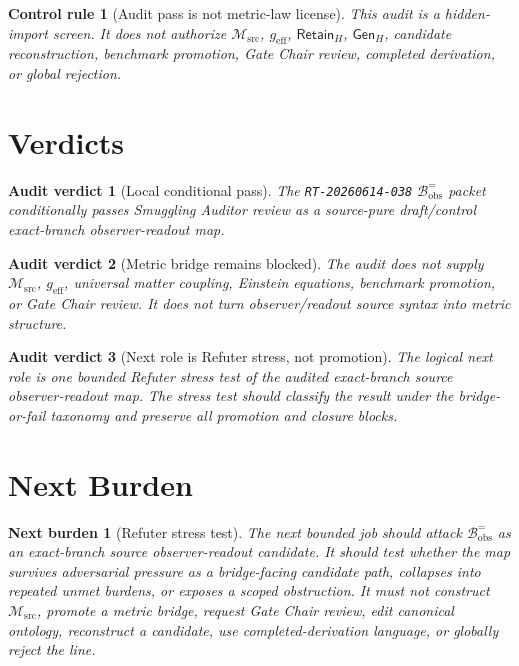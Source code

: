 \documentclass[11pt]{article}
\newcommand{\RetainH}{\mathsf{Retain}_{H}}
\newcommand{\GenH}{\mathsf{Gen}_{H}}
\newcommand{\Bobs}{\mathcal{B}^{=}_{\mathrm{obs}}}
\newcommand{\Msrc}{\mathcal{M}_{\mathrm{src}}}
\newcommand{\geff}{g_{\mathrm{eff}}}
\newtheorem{controlrule}{Control rule}
\newtheorem{verdict}{Audit verdict}
\newtheorem{nextburden}{Next burden}
\begin{document}
\begin{controlrule}[Audit pass is not metric-law license]
This audit is a hidden-import screen. It does not authorize
\(\Msrc\), \(\geff\), \(\RetainH\), \(\GenH\), candidate
reconstruction, benchmark promotion, Gate Chair review, completed
derivation, or global rejection.
\end{controlrule}

\section{Verdicts}

\begin{verdict}[Local conditional pass]
The \texttt{RT-20260614-038} \(\Bobs\) packet conditionally passes
Smuggling Auditor review as a source-pure draft/control exact-branch
observer-readout map.
\end{verdict}

\begin{verdict}[Metric bridge remains blocked]
The audit does not supply \(\Msrc\), \(\geff\), universal matter
coupling, Einstein equations, benchmark promotion, or Gate Chair
review. It does not turn observer/readout source syntax into metric
structure.
\end{verdict}

\begin{verdict}[Next role is Refuter stress, not promotion]
The logical next role is one bounded Refuter stress test of the
audited exact-branch source observer-readout map. The stress test
should classify the result under the bridge-or-fail taxonomy and
preserve all promotion and closure blocks.
\end{verdict}

\section{Next Burden}

\begin{nextburden}[Refuter stress test]
The next bounded job should attack \(\Bobs\) as an exact-branch
source observer-readout candidate. It should test whether the map
survives adversarial pressure as a bridge-facing candidate path,
collapses into repeated unmet burdens, or exposes a scoped
obstruction. It must not construct \(\Msrc\), promote a metric bridge,
request Gate Chair review, edit canonical ontology, reconstruct a
candidate, use completed-derivation language, or globally reject the
line.
\end{nextburden}
\end{document}

